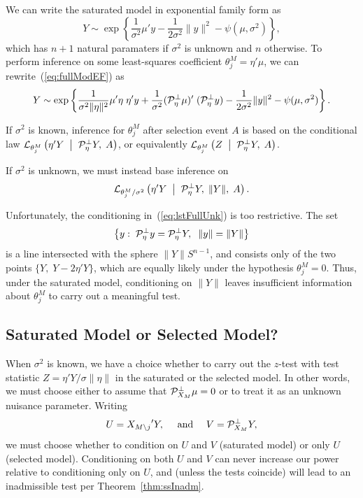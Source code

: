 \documentclass{article}
\theoremstyle{definition}
\newcommand{\bX}{X}
\newcommand{\Gv}{\;\;\big|\;\;}
\newcommand{\proj}{\cP}
\newcommand{\cL}{\mathcal{L}}
\begin{document}
We can write the saturated model in exponential family form as
\begin{equation}\label{eq:fullModEF}
  Y \sim \exp\left\{ \frac{1}{\sigma^2}\mu ' y - \frac{1}{2\sigma^2} \|y\|^2 - \psi(\mu,\sigma^2)\right\},
\end{equation}
which has $n+1$ natural paramaters if $\sigma^2$ is unknown and $n$ otherwise. To perform inference on some least-squares coefficient $\theta_j^{M}=\eta'\mu$, we can rewrite~(\ref{eq:fullModEF}) as
\begin{equation}
  Y \sim \exp\left\{ \frac{1}{\sigma^2\|\eta\|^2} \mu'\eta\; \eta'y +
    \frac{1}{\sigma^2} (\proj_{\eta}^\perp\mu)'\; (\proj_\eta^\perp y)
    - \frac{1}{2\sigma^2}\|y\|^2 - \psi(\mu,\sigma^2)\right\}.
\end{equation}

If $\sigma^2$ is known, inference for $\theta_j^{M}$ after selection event $A$ is based on the conditional law $\cL_{\theta_j^{M}}\left( \eta'Y \Gv \proj_\eta^\perp Y, \; A\right)$, or equivalently $\cL_{\theta_j^{M}}\left( Z \Gv \proj_\eta^\perp Y, \; A\right)$.

If $\sigma^2$ is unknown, we must instead base inference on
\begin{equation}\label{eq:lstFullUnk}
  \cL_{\theta_j^{M}/\sigma^2}\left(\eta'Y \Gv \proj_\eta^\perp Y, \; \|Y\|, \; A\right).
\end{equation}

Unfortunately, the conditioning in~(\ref{eq:lstFullUnk}) is too restrictive. The set
\begin{equation}
  \left\{y:\; \proj_\eta^\perp y = \proj_\eta^\perp Y,\;\; \|y\| = \|Y\| \right\}
\end{equation}
is a line intersected with the sphere $\|Y\|S^{n-1}$, and consists only of the two points $\{Y, \; Y - 2\eta'Y\}$, which are equally likely under the hypothesis $\theta_j^{M}=0$. Thus, under the saturated model, conditioning on $\|Y\|$ leaves insufficient information about $\theta_j^{M}$ to carry out a meaningful test.


\subsection{Saturated Model or Selected Model?}\label{sec:fullVLinear}

When $\sigma^2$ is known, we have a choice whether to carry out the $z$-test with test statistic $Z = \eta'Y/\sigma \|\eta\|$ in the saturated or the selected model. In other words, we must choose either to assume that $\proj_{\bX_M}^\perp \mu = 0$ or to treat it as an unknown nuisance parameter. Writing
\begin{equation}
  U = {\bX_{M\setminus j}}' Y, \quad \text{ and } \quad V = \proj_{\bX_M}^\perp Y,
\end{equation}
we must choose whether to condition on $U$ and $V$ (saturated model) or only $U$ (selected model). Conditioning on both $U$ and $V$ can never increase our power relative to conditioning only on $U$, and (unless the tests coincide) will lead to an inadmissible test per Theorem~\ref{thm:ssInadm}.
\end{document}
